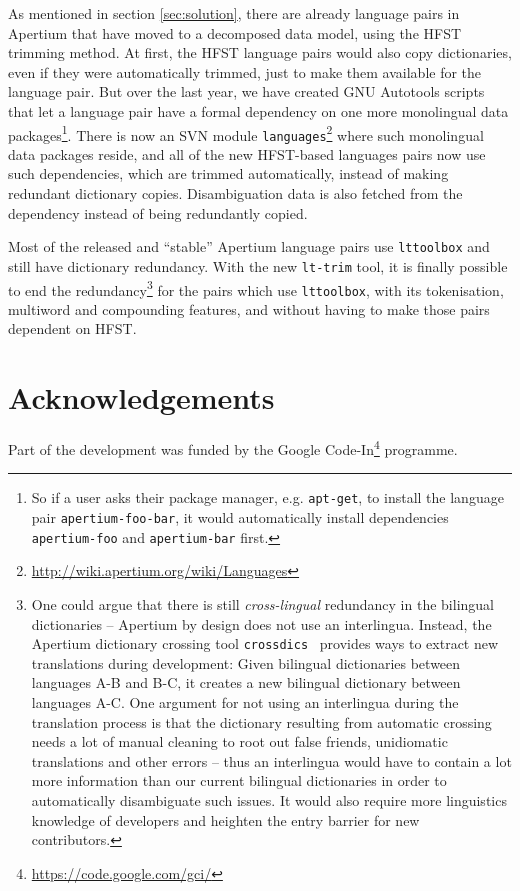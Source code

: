 \documentclass[10pt, a4paper]{article}
\newcommand{\tool}[1]{\texttt{#1}}
\begin{document}
As mentioned in section \ref{sec:solution}, there are already language
pairs in Apertium that have moved to a decomposed data model, using
the HFST trimming method. At first, the HFST language pairs would also
copy dictionaries, even if they were automatically trimmed, just to
make them available for the language pair.  But over the last year, we
have created GNU Autotools scripts that let a language pair have a
formal dependency on one more monolingual data packages\footnote{So if
  a user asks their package manager, e.g. \tool{apt-get}, to install
  the language pair \tool{apertium-foo-bar}, it would automatically
  install dependencies \tool{apertium-foo} and \tool{apertium-bar}
  first.}. There is now an SVN module
\texttt{languages}\footnote{\href{http://wiki.apertium.org/wiki/Languages}{http://wiki.apertium.org/wiki/Languages}}
where such monolingual data packages reside, and all of the new
HFST-based languages pairs now use such dependencies, which are
trimmed automatically, instead of making redundant dictionary copies.
Disambiguation data is also fetched from the dependency instead of
being redundantly copied.

Most of the released and ``stable'' Apertium language pairs use
\tool{lttoolbox} and still have dictionary redundancy. With the new
\tool{lt-trim} tool, it is finally possible to end the
redundancy\footnote{One could argue that there is still
  \emph{cross-lingual} redundancy in the bilingual dictionaries --
  Apertium by design does not use an interlingua. Instead, the
  Apertium dictionary crossing tool
  \tool{crossdics}~\cite{toral2011crossdics-it-ca} provides ways to
  extract new translations during development: Given bilingual
  dictionaries between languages A-B and B-C, it creates a new
  bilingual dictionary between languages A-C. One argument for not
  using an interlingua during the translation process is that the
  dictionary resulting from automatic crossing needs a lot of manual
  cleaning to root out false friends, unidiomatic translations and
  other errors -- thus an interlingua would have to contain a lot more
  information than our current bilingual dictionaries in order to
  automatically disambiguate such issues. It would also require more
  linguistics knowledge of developers and heighten the entry barrier
  for new contributors.} for the pairs which use \tool{lttoolbox},
with its tokenisation, multiword and compounding features, and without
having to make those pairs dependent on HFST.



\section*{Acknowledgements}
Part of the development was funded by the Google
Code-In\footnote{\href{https://code.google.com/gci/}{https://code.google.com/gci/}} programme.



\end{document}
